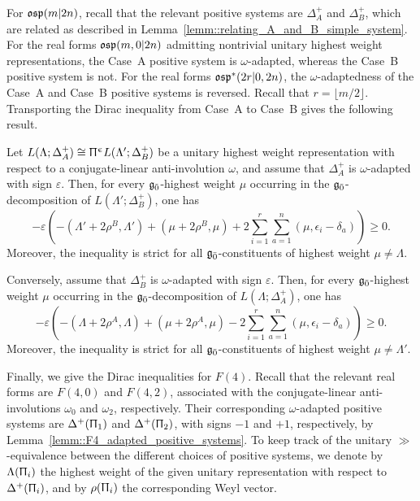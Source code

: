 For ${\mathfrak{osp}}(m\vert 2n)$, recall that the relevant positive systems are
$\Delta_A^{+}$ and $\Delta_B^{+}$, which are related as described in
Lemma~\ref{lemm::relating_A_and_B_simple_system}. For the real forms ${\mathfrak{osp}}(m,0\vert 2n)$ admitting nontrivial unitary highest weight representations, the Case~A positive system is $\omega$-adapted, whereas the Case~B positive system is not. For the real forms ${\mathfrak{osp}}^{\ast}(2r\vert 0,2n)$, the $\omega$-adaptedness of the Case~A and Case~B positive systems is reversed. Recall that $r=\lfloor m/2\rfloor$. Transporting the Dirac
inequality from Case~A to Case~B gives the following result.

\begin{proposition}
Let $L(\Lambda;\Delta_A^{+})
\cong
 \Uppi^{\upepsilon}L(\Lambda';\Delta_B^{+})
$
be a unitary highest weight representation with respect to a
conjugate-linear anti-involution $\omega$, and assume that
$\Delta_A^{+}$ is $\omega$-adapted with sign $\varepsilon$.
Then, for every ${\mathfrak{g}_{\bar{0}}}$-highest weight $\mu$ occurring in the
${\mathfrak{g}_{\bar{0}}}$-decomposition of $L(\Lambda';\Delta_B^{+})$, one has
\[
-\varepsilon(
-(\Lambda'+2\rho^{B},\Lambda')
+(\mu+2\rho^{B},\mu)
+2\sum_{i=1}^{r}\sum_{a=1}^{n}
(\mu,\epsilon_i-\delta_a))\geq 0.
\]
Moreover, the inequality is strict for all ${\mathfrak{g}_{\bar{0}}}$-constituents of highest weight $\mu \neq \Lambda$. 

Conversely, assume that $\Delta_B^{+}$ is $\omega$-adapted with sign $\varepsilon$. Then, for every ${\mathfrak{g}_{\bar{0}}}$-highest weight $\mu$ occurring in the ${\mathfrak{g}_{\bar{0}}}$-decomposition of $L(\Lambda;\Delta_A^{+})$, one has
\[
-\varepsilon\left(
-(\Lambda+2\rho^{A},\Lambda)
+(\mu+2\rho^{A},\mu)
-2\sum_{i=1}^{r}\sum_{a=1}^{n}
(\mu,\epsilon_i-\delta_a)
\right)\geq0.
\]
Moreover, the inequality is strict for all ${\mathfrak{g}_{\bar{0}}}$-constituents of highest weight $\mu\neq\Lambda'$.
\end{proposition}

Finally, we give the Dirac inequalities for $F(4)$. Recall that the relevant real forms are $F(4,0)$ and $F(4,2)$, associated with the conjugate-linear anti-involutions $\omega_{0}$ and $\omega_{2}$, respectively. Their corresponding $\omega$-adapted positive systems are $\Delta^{+}(\Uppi_{1})$ and $\Delta^{+}(\Uppi_{2})$, with signs $-1$ and $+1$, respectively, by Lemma~\ref{lemm::F4_adapted_positive_systems}. To keep track of the unitary $\gg$-equivalence between the different choices of positive systems, we denote by $\Lambda(\Uppi_i)$ the highest weight of the given unitary representation with respect to $\Delta^{+}(\Uppi_i)$, and by $\rho(\Uppi_i)$ the corresponding Weyl vector.


